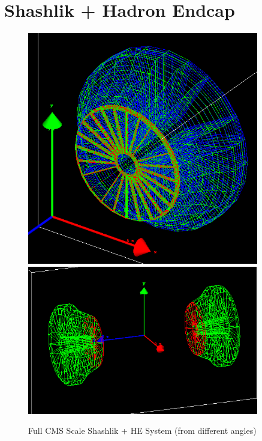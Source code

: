 \section{Shashlik + Hadron Endcap} \label{section:simulations_shashlik}
\begin{figure}[htbp]
    \centering
    \includegraphics[width=0.9\textwidth]{figures/ch_simulations/shashlik/geometry/Shashlik+HE_Complete_Wire.png}\\
    \includegraphics[width=0.9\textwidth]{figures/ch_simulations/shashlik/geometry/SHE_70_20.png}
    \caption{Full CMS Scale Shashlik + HE System (from different angles)}
    \label{fig:higgs_simulations_shashlikexamples}
 \end{figure}

